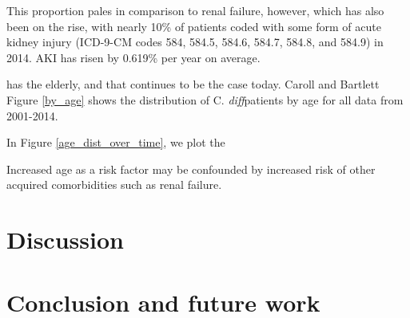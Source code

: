 \documentclass[12pt]{ociamthesis}\usepackage[]{graphicx}\usepackage[]{color}
\newcommand{\cdiff}{C. \textit{diff}}
\begin{document}
This proportion pales in comparison to renal failure, however, which has also been on the rise, with nearly 10\% of patients coded with
some form of acute kidney injury (ICD-9-CM codes 584, 584.5, 584.6, 584.7, 584.8, and 584.9) in 2014. AKI has risen 
by 0.619\% per year on average.


has  the elderly, and that continues to be the case today. Caroll and Bartlett \cite{Carroll2011}
Figure \ref{by_age} shows the distribution of \cdiff patients by age for all data from 2001-2014. 
\cite{Masgala2014}


In Figure \ref{age_dist_over_time}, we plot the



Increased age as a risk factor may be confounded by increased risk of other acquired comorbidities such as renal failure. 
\cite{Krapohl2013} \cite{Masgala2014}


\chapter{Discussion}

\chapter{Conclusion and future work}


% 
\renewcommand{\bibname}{References}
\printbibliography
\end{document}
